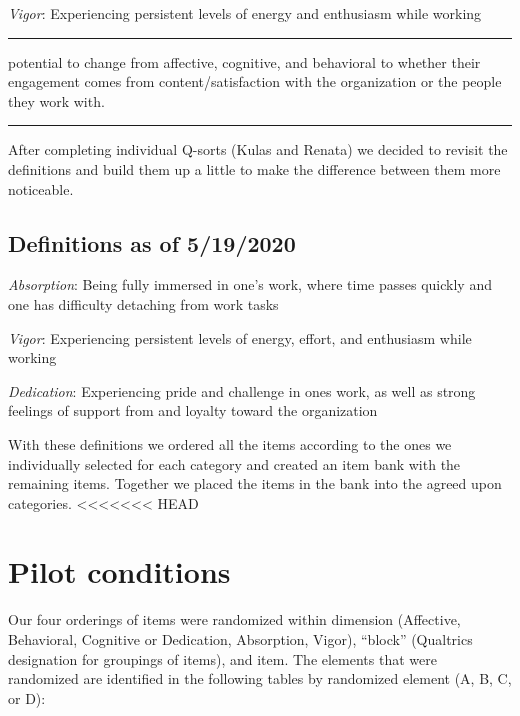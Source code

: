 \documentclass[
]{book}
\begin{document}
\emph{Vigor}: Experiencing persistent levels of energy and enthusiasm while working

\begin{center}\rule{0.5\linewidth}{0.5pt}\end{center}

potential to change from affective, cognitive, and behavioral to whether their engagement comes from content/satisfaction with the organization or the people they work with.

\begin{center}\rule{0.5\linewidth}{0.5pt}\end{center}

After completing individual Q-sorts (Kulas and Renata) we decided to revisit the definitions and build them up a little to make the difference between them more noticeable.

\hypertarget{definitions-as-of-5192020}{%
\section{Definitions as of 5/19/2020}\label{definitions-as-of-5192020}}

\emph{Absorption}: Being fully immersed in one's work, where time passes quickly and one has difficulty detaching from work tasks

\emph{Vigor}: Experiencing persistent levels of energy, effort, and enthusiasm while working

\emph{Dedication}: Experiencing pride and challenge in ones work, as well as strong feelings of support from and loyalty toward the organization

With these definitions we ordered all the items according to the ones we individually selected for each category and created an item bank with the remaining items. Together we placed the items in the bank into the agreed upon categories.
<<<<<<< HEAD

\hypertarget{pilot2}{%
\chapter{Pilot conditions}\label{pilot2}}

Our four orderings of items were randomized within dimension (Affective, Behavioral, Cognitive or Dedication, Absorption, Vigor), ``block'' (Qualtrics designation for groupings of items), and item. The elements that were randomized are identified in the following tables by randomized element (A, B, C, or D):
\end{document}
